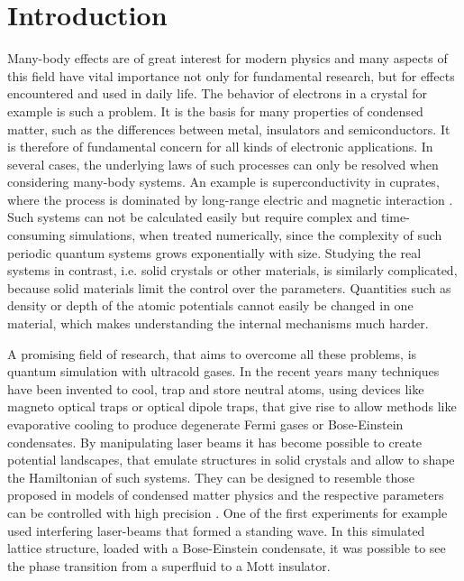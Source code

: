 \chapter{Introduction}

Many-body effects are of great interest for modern physics and many aspects of this field have vital importance not only for fundamental research, but for effects encountered and used in daily life. The behavior of electrons in a crystal for example is such a problem. It is the basis for many properties of condensed matter, such as the differences between metal, insulators and semiconductors. It is therefore of fundamental concern for all kinds of electronic applications. In several cases, the underlying laws of such processes can only be resolved when considering many-body systems. An example is superconductivity in cuprates, where the process is dominated by long-range electric and magnetic interaction \cite{cuprates}. Such systems can not be calculated easily but require complex and time-consuming simulations, when treated numerically, since the complexity of such periodic quantum systems grows exponentially with size\cite{feynman}. Studying the real systems in contrast, i.e. solid crystals or other materials, is similarly complicated, because solid materials limit the control over the parameters. Quantities such as density or depth of the atomic potentials cannot easily be changed in one material, which makes understanding the internal mechanisms much harder. 

A promising field of research, that aims to overcome all these problems, is quantum simulation with ultracold gases. In the recent years many techniques have been invented to cool, trap and store neutral atoms, using devices like magneto optical traps or optical dipole traps\cite{metcalf}, that give rise to allow methods like evaporative cooling to produce degenerate Fermi gases or Bose-Einstein condensates. By manipulating laser beams it has become possible to create potential landscapes, that emulate structures in solid crystals and allow to shape the Hamiltonian of such systems. They can be designed to resemble those proposed in models of condensed matter physics and the respective parameters can be controlled with high precision \cite{bloch}. One of the first experiments for example used interfering laser-beams that formed a standing wave. In this simulated lattice structure, loaded with a Bose-Einstein condensate, it was possible to see the phase transition from a superfluid to a Mott insulator\cite{greiner}.

